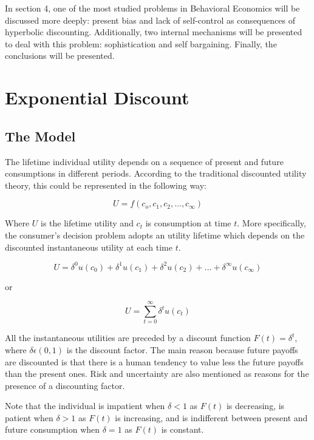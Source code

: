 \documentclass[]{article}
\begin{document}
In section 4, one of the most studied problems in Behavioral Economics will be discussed more deeply: present bias and lack of self-control as consequences of hyperbolic discounting. Additionally, two internal mechanisms will be presented to deal with this problem: sophistication and self bargaining. Finally, the conclusions will be presented.

\hypertarget{exponential-discount}{%
\section{Exponential Discount}\label{exponential-discount}}

\hypertarget{the-model}{%
\subsection{The Model}\label{the-model}}

The lifetime individual utility depends on a sequence of present and future consumptions in different periods. According to the traditional discounted utility theory, this could be represented in the following way:

\[
U = f(c_{o}, c_{1}, c_{2},\dots, c_{\infty})
\]

Where \(U\) is the lifetime utility and \(c_{t}\) is consumption at time \(t\). More specifically, the consumer's decision problem adopts an utility lifetime which depends on the discounted instantaneous utility at each time \(t\).

\[
U = \delta^0 u(c_{0})+ \delta^1 u(c_{1}) + \delta^2 u(c_{2}) + \dots + \delta^\infty u(c_{\infty})
\]

or

\[
U = \sum_{t=0}^{\infty}\delta^t u(c_{t})
\]

All the instantaneous utilities are preceded by a discount function \(F(t) = \delta^t\), where \(\delta \epsilon(0,1)\) is the discount factor. The main reason because future payoffs are discounted is that there is a human tendency to value less the future payoffs than the present ones. Risk and uncertainty are also mentioned as reasons for the presence of a discounting factor.

Note that the individual is impatient when \(\delta<1\) as \(F(t)\) is decreasing, is patient when \(\delta>1\) as \(F(t)\) is increasing, and is indifferent between present and future consumption when \(\delta=1\) as \(F(t)\) is constant.
\end{document}
